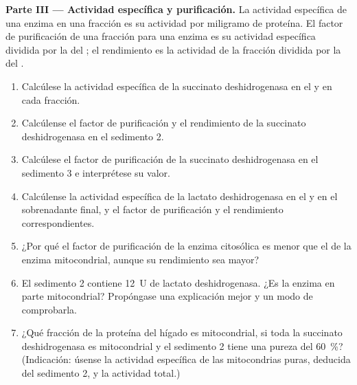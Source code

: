 \begin{problem}
\medskip
\noindent\textbf{Parte III --- Actividad específica y purificación.}
La actividad específica de una enzima en una fracción es su actividad por
miligramo de proteína. El factor de purificación de una fracción para una
enzima es su actividad específica dividida por la del ; el
rendimiento es la actividad de la fracción dividida por la del
.
\begin{enumerate}[resume]
  \item Calcúlese la actividad específica de la succinato deshidrogenasa en
        el  y en cada fracción.
  \item Calcúlense el factor de purificación y el rendimiento de la
        succinato deshidrogenasa en el sedimento 2.
  \item Calcúlese el factor de purificación de la succinato deshidrogenasa
        en el sedimento 3 e interprétese su valor.
  \item Calcúlense la actividad específica de la lactato deshidrogenasa en
        el  y en el sobrenadante final, y el factor de
        purificación y el rendimiento correspondientes.
  \item ¿Por qué el factor de purificación de la enzima citosólica es menor
        que el de la enzima mitocondrial, aunque su rendimiento sea mayor?
  \item El sedimento 2 contiene \qty{12}{U} de lactato deshidrogenasa. ¿Es
        la enzima en parte mitocondrial? Propóngase una explicación mejor y
        un modo de comprobarla.
  \item ¿Qué fracción de la proteína del hígado es mitocondrial, si toda la
        succinato deshidrogenasa es mitocondrial y el sedimento 2 tiene una
        pureza del \qty{60}{\%}? (Indicación: úsense la actividad
        específica de las mitocondrias puras, deducida del sedimento 2, y
        la actividad total.)
\end{enumerate}


\end{problem}
